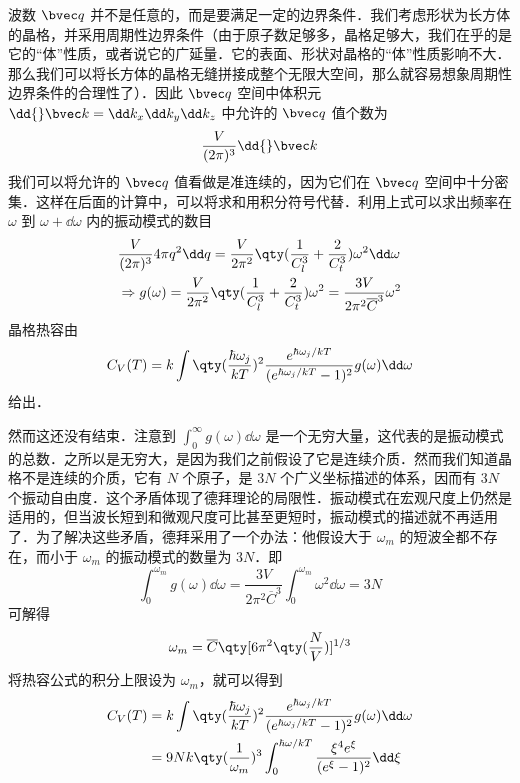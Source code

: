 波数 $\bvec q$ 并不是任意的，而是要满足一定的边界条件．我们考虑形状为长方体的晶格，并采用周期性边界条件（由于原子数足够多，晶格足够大，我们在乎的是它的“体”性质，或者说它的广延量．它的表面、形状对晶格的“体”性质影响不大．那么我们可以将长方体的晶格无缝拼接成整个无限大空间，那么就容易想象周期性边界条件的合理性了）．因此 $\bvec q$ 空间中体积元 $\dd{} \bvec k=\dd k_x\dd k_y\dd k_z$ 中允许的 $\bvec q$ 值个数为
\begin{equation}
\frac{V}{(2\pi)^3} \dd{} \bvec k
\end{equation}
我们可以将允许的 $\bvec q$ 值看做是准连续的，因为它们在 $\bvec q$ 空间中十分密集．这样在后面的计算中，可以将求和用积分符号代替．利用上式可以求出频率在 $\omega$ 到 $\omega+\dd \omega$ 内的振动模式的数目
\begin{equation}
\begin{aligned}
&\frac{V}{(2\pi)^3}4\pi q^2\dd q=\frac{V}{2\pi^2}\qty(\frac{1}{C_l^3}+\frac{2}{C_t^3})\omega^2\dd \omega\\
&\Rightarrow g(\omega)= \frac{V}{2\pi^2}\qty(\frac{1}{C_l^3}+\frac{2}{C_t^3}) \omega^2=\frac{3V}{2\pi^2 \overline C ^3} \omega^2
\end{aligned}
\end{equation}
晶格热容由
\begin{equation}
C_V(T)=k \int \qty(\frac{\hbar\omega_j}{kT})^2\frac{e^{\hbar \omega_j/kT}}{(e^{\hbar\omega_j/kT}-1)^2} g(\omega)\dd \omega
\end{equation}
给出．

然而这还没有结束．注意到 $\int_0^\infty g(\omega)\dd \omega$ 是一个无穷大量，这代表的是振动模式的总数．之所以是无穷大，是因为我们之前假设了它是连续介质．然而我们知道晶格不是连续的介质，它有 $N$ 个原子，是 $3N$ 个广义坐标描述的体系，因而有 $3N$ 个振动自由度．这个矛盾体现了德拜理论的局限性．振动模式在宏观尺度上仍然是适用的，但当波长短到和微观尺度可比甚至更短时，振动模式的描述就不再适用了．为了解决这些矛盾，德拜采用了一个办法：他假设大于 $\omega_m$ 的短波全都不存在，而小于 $\omega_m$ 的振动模式的数量为 $3N$．即
\begin{equation}
\int_0^{\omega_m} g(\omega)\dd \omega = \frac{3V}{2\pi^2\overline C^3}\int_0^{\omega_m}\omega^2\dd \omega =3N
\end{equation}
可解得
\begin{equation}
\omega_m = \overline C \qty[6\pi^2 \qty(\frac{N}{V})]^{1/3}
\end{equation}
将热容公式的积分上限设为 $\omega_m$，就可以得到
\begin{equation}
\begin{aligned}
C_V(T)&=k \int \qty(\frac{\hbar\omega_j}{kT})^2\frac{e^{\hbar \omega_j/kT}}{(e^{\hbar\omega_j/kT}-1)^2} g(\omega)\dd \omega\\
&=9Nk\qty(\frac{1}{\omega_m})^3 \int_0^{\hbar\omega/kT} \frac{\xi^4 e^\xi}{(e^\xi-1)^2}\dd \xi
\end{aligned}
\end{equation}